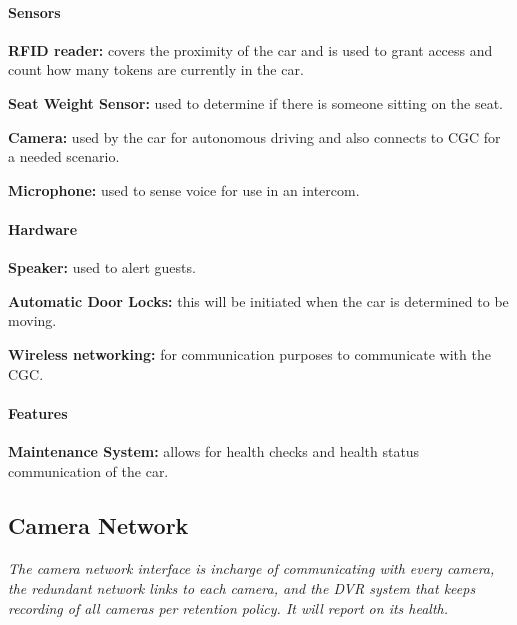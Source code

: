 \documentclass[12pt]{article}
\begin{document}
	\paragraph{Sensors}
	\begin{list}{}{}
		\item \textbf{RFID reader: }covers the proximity of the car and is used 
		to grant access and count how many tokens are currently in the car. 
		\item \textbf{Seat Weight Sensor: }used to determine if there is someone 
		sitting on the seat. 
		\item \textbf{Camera: }used by the car for autonomous driving and also 
		connects to CGC for a needed scenario. 
		\item \textbf{Microphone: }used to sense voice for use in an intercom.
	\end{list}
		
	\paragraph{Hardware}
	\begin{list}{}{}
		\item \textbf{Speaker: }used to alert guests.
		\item \textbf{Automatic Door Locks: }this will be initiated when the car 
		is determined to be moving.
		\item \textbf{Wireless networking: }for communication purposes to communicate 
		with the CGC.
	\end{list}
	
	\paragraph{Features}
	\begin{list}{}{}
		\item \textbf{Maintenance System: }allows for health checks and health status 
		communication of the car.  
	\end{list}

	\subsection{Camera Network}
	\paragraph{} \textit{The camera network interface is incharge of communicating with every camera, the redundant network links to each camera, and the DVR system that keeps recording of all cameras per retention policy. It will report on its health.}		
	
\end{document}
